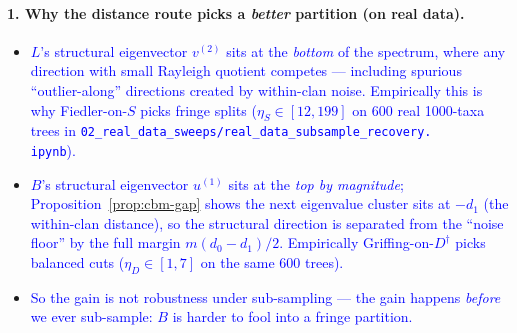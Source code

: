 \documentclass[11pt]{article}
\newcommand{\new}[1]{\textcolor{blue}{#1}}
\theoremstyle{remark}
\newcommand{\1}{\mathbf{1}}
\newcommand{\Ddist}{D^{\dagger}}      %
\newcommand{\Bop}{B}
\begin{document}
\paragraph{1. Why the distance route picks a \emph{better} partition (on real data).}
\begin{itemize}
  \item \new{$L$'s structural eigenvector $v^{(2)}$ sits at the
        \emph{bottom} of the spectrum, where any direction with small
        Rayleigh quotient competes --- including spurious
        ``outlier-along'' directions created by within-clan noise.
        Empirically this is why Fiedler-on-$S$ picks fringe splits
        ($\eta_{S} \in [12, 199]$ on 600 real 1000-taxa trees in
        \texttt{02\_real\_data\_sweeps/real\_data\_subsample\_recovery.\\ipynb}).}
  \item \new{$\Bop$'s structural eigenvector $u^{(1)}$ sits at the
        \emph{top by magnitude}; Proposition~\ref{prop:cbm-gap} shows the
        next eigenvalue cluster sits at $-d_{1}$ (the within-clan
        distance), so the structural direction is separated from the
        ``noise floor'' by the full margin $m(d_{0} - d_{1})/2$.
        Empirically Griffing-on-$\Ddist$ picks balanced cuts
        ($\eta_{D} \in [1, 7]$ on the same 600 trees).}
  \item \new{So the gain is not robustness under sub-sampling --- the
        gain happens \emph{before} we ever sub-sample: $\Bop$ is harder
        to fool into a fringe partition.}
\end{itemize}
\end{document}
